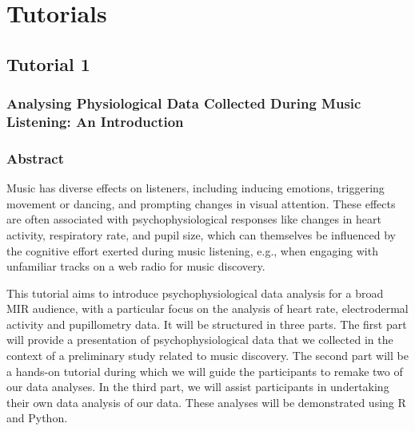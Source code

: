 \chapter*{Tutorials}
%
\thispagestyle{empty}\cleardoublepage


\section*{Tutorial 1}
{}
%
\subsection*{Analysing Physiological Data Collected During Music Listening: 
An Introduction}

\subsection*{Abstract}
Music has diverse effects on listeners, including inducing emotions, triggering movement or dancing, and prompting changes in visual attention. These effects are often associated with psychophysiological responses like changes in heart activity, respiratory rate, and pupil size, which can themselves be influenced by the cognitive effort exerted during music listening, e.g., when engaging with unfamiliar tracks on a web radio for music discovery.

This tutorial aims to introduce psychophysiological data analysis for a broad MIR audience, with a particular focus on the analysis of heart rate, electrodermal activity and pupillometry data. It will be structured in three parts. The first part will provide a presentation of psychophysiological data that we collected in the context of a preliminary study related to music discovery. The second part will be a hands-on tutorial during which we will guide the participants to remake two of our data analyses. In the third part, we will assist participants in undertaking their own data analysis of our data. These analyses will be demonstrated using R and Python.

